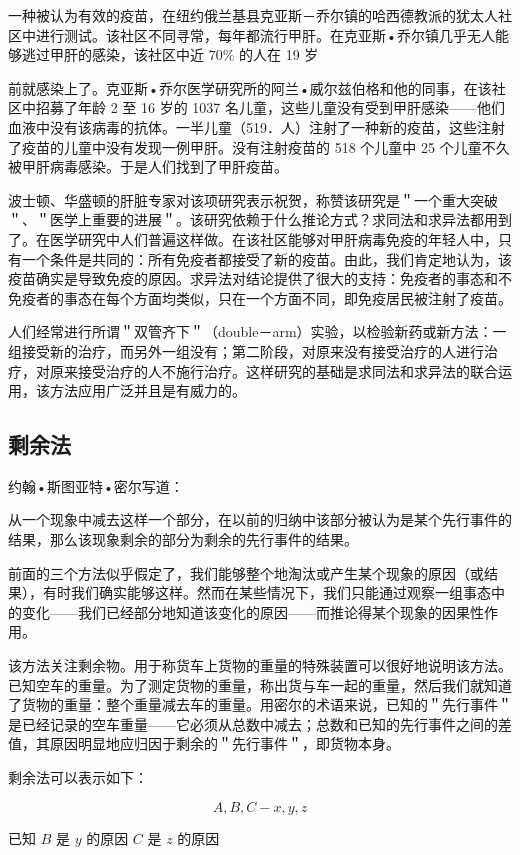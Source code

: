 一种被认为有效的疫苗，在纽约俄兰基县克亚斯－乔尔镇的哈西德教派的犹太人社区中进行测试。该社区不同寻常，每年都流行甲肝。在克亚斯•乔尔镇几乎无人能够逃过甲肝的感染，该社区中近 $70 \%$ 的人在 19 岁

前就感染上了。克亚斯•乔尔医学研究所的阿兰•威尔兹伯格和他的同事，在该社区中招募了年龄 2 至 16 岁的 1037 名儿童，这些儿童没有受到甲肝感染——他们血液中没有该病毒的抗体。一半儿童（519．人）注射了一种新的疫苗，这些注射了疫苗的儿童中没有发现一例甲肝。没有注射疫苗的 518 个儿童中 25 个儿童不久被甲肝病毒感染。于是人们找到了甲肝疫苗。\cite{werzberger1992}

波士顿、华盛顿的肝脏专家对该项研究表示祝贺，称赞该研究是＂一个重大突破＂、＂医学上重要的进展＂。该研究依赖于什么推论方式？求同法和求异法都用到了。在医学研究中人们普遍这样做。在该社区能够对甲肝病毒免疫的年轻人中，只有一个条件是共同的：所有免疫者都接受了新的疫苗。由此，我们肯定地认为，该疫苗确实是导致免疫的原因。求异法对结论提供了很大的支持：免疫者的事态和不免疫者的事态在每个方面均类似，只在一个方面不同，即免疫居民被注射了疫苗。

人们经常进行所谓＂双管齐下＂（double－arm）实验，以检验新药或新方法：一组接受新的治疗，而另外一组没有；第二阶段，对原来没有接受治疗的人进行治疗，对原来接受治疗的人不施行治疗。这样研究的基础是求同法和求异法的联合运用，该方法应用广泛并且是有威力的。

\subsection{剩余法}
约翰•斯图亚特•密尔写道：

从一个现象中减去这样一个部分，在以前的归纳中该部分被认为是某个先行事件的结果，那么该现象剩余的部分为剩余的先行事件的结果。

前面的三个方法似乎假定了，我们能够整个地淘汰或产生某个现象的原因（或结果），有时我们确实能够这样。然而在某些情况下，我们只能通过观察一组事态中的变化——我们已经部分地知道该变化的原因——而推论得某个现象的因果性作用。

该方法关注剩余物。用于称货车上货物的重量的特殊装置可以很好地说明该方法。已知空车的重量。为了测定货物的重量，称出货与车一起的重量，然后我们就知道了货物的重量：整个重量减去车的重量。用密尔的术语来说，已知的＂先行事件＂是已经记录的空车重量——它必须从总数中减去；总数和已知的先行事件之间的差值，其原因明显地应归因于剩余的＂先行事件＂，即货物本身。

剩余法可以表示如下：

$$
A, B, C-x, y, z
$$

已知 $B$ 是 $y$ 的原因 $C$ 是 $z$ 的原因

